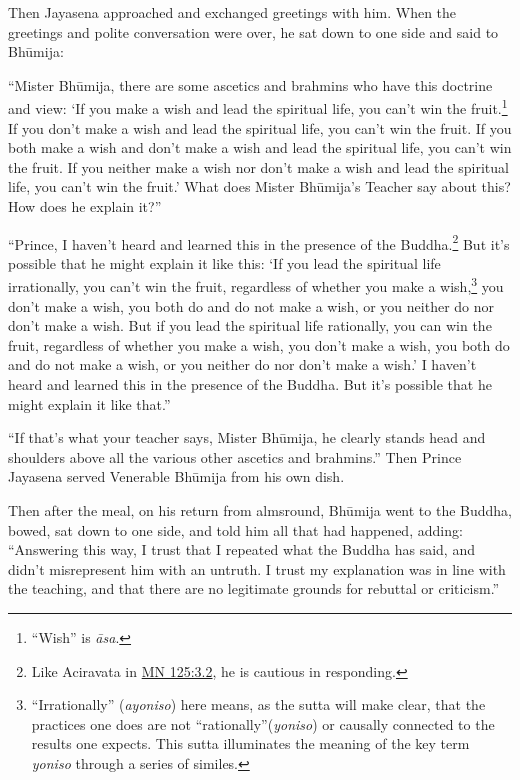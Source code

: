 \documentclass[12pt,openany]{book}%
\begin{document}
Then Jayasena approached and exchanged greetings with him. When the greetings and polite conversation were over, he sat down to one side and said to \textsanskrit{Bhūmija}: 

“Mister \textsanskrit{Bhūmija}, there are some ascetics and brahmins who have this doctrine and view: ‘If you make a wish and lead the spiritual life, you can’t win the fruit.\footnote{“Wish” is \textit{\textsanskrit{āsa}}. } If you don’t make a wish and lead the spiritual life, you can’t win the fruit. If you both make a wish and don’t make a wish and lead the spiritual life, you can’t win the fruit. If you neither make a wish nor don’t make a wish and lead the spiritual life, you can’t win the fruit.’ What does Mister \textsanskrit{Bhūmija}’s Teacher say about this? How does he explain it?” 

“Prince, I haven’t heard and learned this in the presence of the Buddha.\footnote{Like Aciravata in \href{https://suttacentral.net/mn125/en/sujato\#3.2}{MN 125:3.2}, he is cautious in responding. } But it’s possible that he might explain it like this: ‘If you lead the spiritual life irrationally, you can’t win the fruit, regardless of whether you make a wish,\footnote{“Irrationally” (\textit{ayoniso}) here means, as the sutta will make clear, that the practices one does are not “rationally”(\textit{yoniso})  or causally connected to the results one expects. This sutta illuminates the meaning of the key term \textit{yoniso} through a series of similes. } you don’t make a wish, you both do and do not make a wish, or you neither do nor don’t make a wish. But if you lead the spiritual life rationally, you can win the fruit, regardless of whether you make a wish, you don’t make a wish, you both do and do not make a wish, or you neither do nor don’t make a wish.’ I haven’t heard and learned this in the presence of the Buddha. But it’s possible that he might explain it like that.” 

“If that’s what your teacher says, Mister \textsanskrit{Bhūmija}, he clearly stands head and shoulders above all the various other ascetics and brahmins.” Then Prince Jayasena served Venerable \textsanskrit{Bhūmija} from his own dish. 

Then after the meal, on his return from almsround, \textsanskrit{Bhūmija} went to the Buddha, bowed, sat down to one side, and told him all that had happened, adding: “Answering this way, I trust that I repeated what the Buddha has said, and didn’t misrepresent him with an untruth. I trust my explanation was in line with the teaching, and that there are no legitimate grounds for rebuttal or criticism.” 
\end{document}
